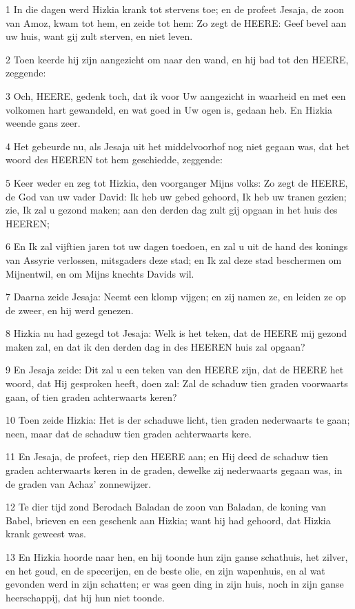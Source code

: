 \par 1 In die dagen werd Hizkia krank tot stervens toe; en de profeet Jesaja, de zoon van Amoz, kwam tot hem, en zeide tot hem: Zo zegt de HEERE: Geef bevel aan uw huis, want gij zult sterven, en niet leven.
\par 2 Toen keerde hij zijn aangezicht om naar den wand, en hij bad tot den HEERE, zeggende:
\par 3 Och, HEERE, gedenk toch, dat ik voor Uw aangezicht in waarheid en met een volkomen hart gewandeld, en wat goed in Uw ogen is, gedaan heb. En Hizkia weende gans zeer.
\par 4 Het gebeurde nu, als Jesaja uit het middelvoorhof nog niet gegaan was, dat het woord des HEEREN tot hem geschiedde, zeggende:
\par 5 Keer weder en zeg tot Hizkia, den voorganger Mijns volks: Zo zegt de HEERE, de God van uw vader David: Ik heb uw gebed gehoord, Ik heb uw tranen gezien; zie, Ik zal u gezond maken; aan den derden dag zult gij opgaan in het huis des HEEREN;
\par 6 En Ik zal vijftien jaren tot uw dagen toedoen, en zal u uit de hand des konings van Assyrie verlossen, mitsgaders deze stad; en Ik zal deze stad beschermen om Mijnentwil, en om Mijns knechts Davids wil.
\par 7 Daarna zeide Jesaja: Neemt een klomp vijgen; en zij namen ze, en leiden ze op de zweer, en hij werd genezen.
\par 8 Hizkia nu had gezegd tot Jesaja: Welk is het teken, dat de HEERE mij gezond maken zal, en dat ik den derden dag in des HEEREN huis zal opgaan?
\par 9 En Jesaja zeide: Dit zal u een teken van den HEERE zijn, dat de HEERE het woord, dat Hij gesproken heeft, doen zal: Zal de schaduw tien graden voorwaarts gaan, of tien graden achterwaarts keren?
\par 10 Toen zeide Hizkia: Het is der schaduwe licht, tien graden nederwaarts te gaan; neen, maar dat de schaduw tien graden achterwaarts kere.
\par 11 En Jesaja, de profeet, riep den HEERE aan; en Hij deed de schaduw tien graden achterwaarts keren in de graden, dewelke zij nederwaarts gegaan was, in de graden van Achaz' zonnewijzer.
\par 12 Te dier tijd zond Berodach Baladan de zoon van Baladan, de koning van Babel, brieven en een geschenk aan Hizkia; want hij had gehoord, dat Hizkia krank geweest was.
\par 13 En Hizkia hoorde naar hen, en hij toonde hun zijn ganse schathuis, het zilver, en het goud, en de specerijen, en de beste olie, en zijn wapenhuis, en al wat gevonden werd in zijn schatten; er was geen ding in zijn huis, noch in zijn ganse heerschappij, dat hij hun niet toonde.

